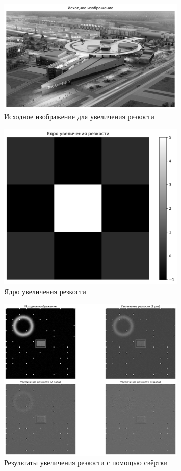 \begin{figure}[H]
    \centering
    \includegraphics[width=0.8\textwidth]{images/task3/original_image.png}
    \caption{Исходное изображение для увеличения резкости}
    \label{fig:original_sharp}
\end{figure}

\begin{figure}[H]
    \centering
    \includegraphics[width=0.8\textwidth]{images/task3/sharpening_kernel.png}
    \caption{Ядро увеличения резкости}
    \label{fig:sharpening_kernel}
\end{figure}

\begin{figure}[H]
    \centering
    \includegraphics[width=0.8\textwidth]{images/task3/convolution_results.png}
    \caption{Результаты увеличения резкости с помощью свёртки}
    \label{fig:convolution_sharp}
\end{figure}

